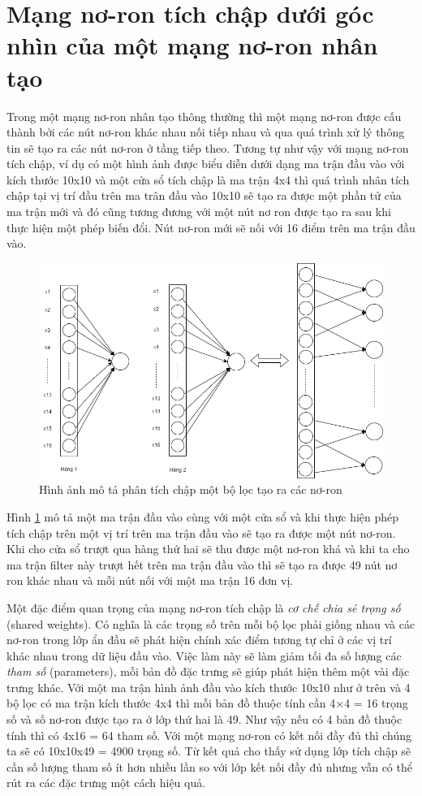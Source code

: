 \section{Mạng nơ-ron tích chập dưới góc nhìn của một mạng nơ-ron nhân tạo}
\hspace{\parindent} Trong một mạng nơ-ron nhân tạo thông thường thì một mạng nơ-ron được cấu thành bởi các nút nơ-ron khác nhau nối tiếp nhau và qua quá trình xử lý thông tin sẽ tạo ra các nút nơ-ron ở tầng tiếp theo. Tương tự như vậy với mạng nơ-ron tích chập, ví dụ có một hình ảnh được biểu diễn dưới dạng ma trận đầu vào với kích thước 10x10 và một cửa sổ tích chập là ma trận 4x4 thì quá trình nhân tích chập tại vị trí đầu trên ma trân đầu vào 10x10 sẽ tạo ra được một phần tử của ma trận mới và đó cũng tương đương với một nút nơ ron được tạo ra sau khi thực hiện một phép biến đổi. Nút nơ-ron mới sẽ nối với 16 điểm trên ma trận đầu vào.

\begin{figure}[!h]
	\centering
		\includegraphics[width=0.8\columnwidth]{chapter05/figure/cnn_filter.png}
		\centering
	\caption{Hình ảnh mô tả phân tích chập một bộ lọc tạo ra các nơ-ron}
	\label{fig:CNN}
\end{figure}

Hình \ref{fig:CNN} mô tả một ma trận đầu vào cùng với một cửa sổ và khi thực hiện phép tích chập trên một vị trí trên ma trận đầu vào sẽ tạo ra được một nút nơ-ron. Khi cho cửa sổ trượt qua hàng thứ hai sẽ thu được một nơ-ron khá và khi ta cho ma trận filter này trượt hết trên ma trận đầu vào thì sẽ tạo ra được 49 nút nơ ron khác nhau và mỗi nút nối với một ma trận 16 đơn vị.


Một đặc điểm quan trọng của mạng nơ-ron tích chập là \textit{cơ chế chia sẻ trọng số} (shared weights). Có nghĩa là các trọng số trên mỗi bộ lọc phải giống nhau và các nơ-ron trong lớp ẩn đầu sẽ phát hiện chính xác điểm tương tự chỉ ở các vị trí khác nhau trong dữ liệu đầu vào. Việc làm này sẽ làm giảm tối đa số lượng các \textit{tham số} (parameters), mỗi bản đồ đặc trưng sẽ giúp phát hiện thêm một vài đặc trưng khác.
Với một ma trận hình ảnh đầu vào kích thước 10x10 như ở trên và 4 bộ lọc có ma trận kích thước 4x4 thì mỗi bản đồ thuộc tính cần 4×4 = 16 trọng số và số nơ-ron được tạo ra ở lớp thứ hai là 49. Như vậy nếu có 4 bản đồ thuộc tính thì có 4x16 = 64 tham số. Với một mạng nơ-ron có kết nối đầy đủ thì chúng ta sẽ có 10x10x49 = 4900 trọng số. Từ kết quả cho thấy sử dụng lớp tích chập sẽ cần số lượng tham số ít hơn nhiều lần so với lớp kết nối đầy đủ nhưng vẫn có thể rút ra các đặc trưng một cách hiệu quả.


